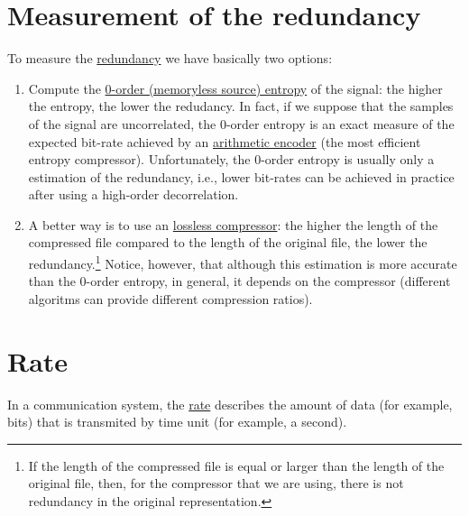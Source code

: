 \section{Measurement of the redundancy}
To measure the
\href{https://en.wikipedia.org/wiki/Redundancy_(information_theory)}{redundancy}
we have basically two options:
\begin{enumerate}
\item Compute the
  \href{https://en.wikipedia.org/wiki/Entropy_(information_theory)}{0-order
    (memoryless source) entropy} of the signal: the higher the
  entropy, the lower the redudancy. In fact, if we suppose that the
  samples of the signal are uncorrelated, the 0-order entropy is an
  exact measure of the expected bit-rate achieved by an
  \href{https://en.wikipedia.org/wiki/Arithmetic_coding}{arithmetic
    encoder} (the most efficient entropy compressor). Unfortunately,
  the 0-order entropy is usually only a estimation of the redundancy,
  i.e., lower bit-rates can be achieved in practice after using a high-order
  decorrelation.
\item A better way is to use an
  \href{https://en.wikipedia.org/wiki/Data_compression}{lossless
    compressor}: the higher the length of the compressed file compared
  to the length of the original file, the lower the
  redundancy.\footnote{If the length of the compressed file is equal or
  larger than the length of the original file, then, for the compressor
  that we are using, there is not redundancy in the original
  representation.} Notice, however, that although this estimation is
  more accurate than the 0-order entropy, in general, it depends on the
  compressor (different algoritms can provide different
  compression ratios).
\end{enumerate}

\section{Rate}

In a communication system, the
\href{https://en.wikipedia.org/wiki/Bit_rate}{rate} describes the
amount of data (for example, bits) that is transmited by time unit
(for example, a second).

